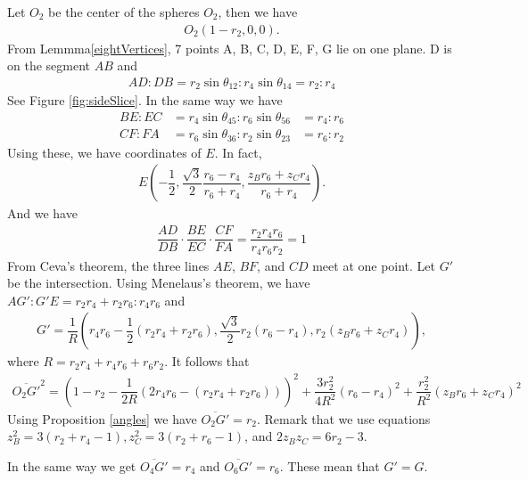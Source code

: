 \documentclass[dvipdfmx]{interact}
\theoremstyle{plain}%
\theoremstyle{definition}
\theoremstyle{remark}
\theoremstyle{problemstyle}
\begin{document}
Let $O_2$ be the center of the spheres $O_2$, then we have
\begin{align*}
 O_2(1 - r_2, 0, 0).
\end{align*}
From Lemmma\ref{eightVertices}, 7 points A, B, C, D, E, F, G lie on one plane. D is on
the segment $AB$ and
\begin{align*}
 AD : DB = r_2\sin\theta_{12} : r_4\sin\theta_{14} = r_2 : r_4
\end{align*}
See Figure \ref{fig:sideSlice}. In the same way we have
\begin{align*}
 BE : EC &= r_4\sin\theta_{45} : r_6\sin\theta_{56} &= r_4:r_6\\
 CF : FA &= r_6\sin\theta_{36} : r_2\sin\theta_{23} &= r_6:r_2
\end{align*}
Using these, we have coordinates of $E$. In fact,
\begin{align*}
 E(-\dfrac{1}{2},\dfrac{\sqrt{3}}{2}\dfrac{r_6-r_4}{r_6 + r_4},
 \dfrac{z_Br_6 + z_C r_4}{r_6 + r_4}).
\end{align*}
And we have
\begin{align*}
 \dfrac{AD}{DB} \cdot \dfrac{BE}{EC} \cdot \dfrac{CF}{FA} = \dfrac{r_2r_4r_6}{r_4r_6r_2} = 1
\end{align*}
From Ceva's theorem, the three lines $AE$, $BF$, and $CD$ meet at one
point. Let $G'$ be the intersection. Using Menelaus's theorem, we have
$AG':G'E = r_2r_4 + r_2r_6:r_4r_6$ and
\begin{align*}
 G' = \dfrac{1}{R}(r_4r_6 - \dfrac{1}{2}(r_2r_4 + r_2r_6), 
 \dfrac{\sqrt{3}}{2}r_2(r_6 - r_4), r_2(z_Br_6 + z_Cr_4)),
\end{align*}
where $R = r_2r_4 + r_4r_6 + r_6r_2.$ It follows that
\begin{align*}
 \overline{O_2G'}^2 = (1 - r_2 - \dfrac{1}{2R}(2r_4r_6 - (r_2r_4 +
 r_2r_6)))^2 + \dfrac{3r^2_2}{4R^2}(r_6 - r_4)^2 +
 \dfrac{r_2^2}{R^2}(z_Br_6 + z_Cr_4)^2
\end{align*}
Using Proposition \ref{angles} we have $\overline{O_2G'} = r_2$. Remark that we
use equations $z_B^2 = 3(r_2 + r_4 - 1), z_C^2 = 3(r_2 + r_6 - 1)$, and
$2z_Bz_C = 6r_2 - 3$.

In the same way we get $\overline{O_4G'} = r_4$ and 
$\overline{O_6G'} = r_6$. These mean that $G' = G$.
\end{document}
